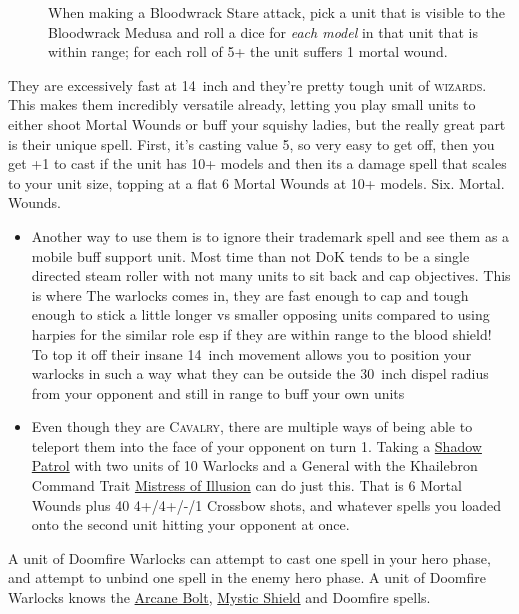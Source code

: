 \begin{description}
    \item [] When making
        a Bloodwrack Stare attack, pick a unit that is visible to the
        Bloodwrack Medusa and roll a dice for \emph{each model} in that unit
        that is within range; for each roll of 5+ the unit suffers 1 mortal
        wound.
\end{description}


They are excessively fast at 14~inch and they're pretty tough unit of
\textsc{wizards}. This makes them incredibly versatile already, letting you
play small units to either shoot Mortal Wounds or buff your squishy ladies, but
the really great part is their unique spell. First, it's casting value 5, so
very easy to get off, then you get +1 to cast if the unit has 10+ models and
then its a damage spell that scales to your unit size, topping at a flat
6 Mortal Wounds at 10+ models. Six. Mortal. Wounds. 
\begin{itemize}
    \item Another way to use them is to ignore their trademark spell and see
        them as a mobile buff support unit. Most time than not \textsc{DoK}
        tends to be a single directed steam roller with not many units to sit
        back and cap objectives. This is where The warlocks comes in, they are
        fast enough to cap and tough enough to stick a little longer vs smaller
        opposing units compared to using harpies for the similar role esp if
        they are within range to the blood shield! To top it off their insane
        14~inch movement allows you to position your warlocks in such a way
        what they can be outside the 30~inch dispel radius from your opponent
        and still in range to buff your own units 
    \item Even though they are \textsc{Cavalry}, there are multiple ways of
        being able to teleport them into the face of your opponent on turn 1.
        Taking a \hyperref[shadowpaths]{Shadow Patrol} with two units of 10
        Warlocks and a General with the Khailebron Command Trait
        \hyperref[mistress-of-illusion]{Mistress of Illusion} can do just this.
        That is 6 Mortal Wounds plus 40 4+/4+/-/1 Crossbow shots, and whatever
        spells you loaded onto the second unit hitting your opponent at once.
\end{itemize}
A unit of Doomfire Warlocks can attempt to cast one spell in your hero phase,
and attempt to unbind one spell in the enemy hero phase. A unit of Doomfire
Warlocks knows the \hyperref[arcane-bolt]{Arcane Bolt},
\hyperref[mystic-shield]{Mystic Shield} and Doomfire spells.

